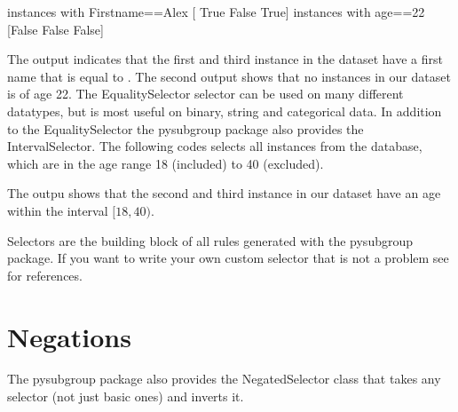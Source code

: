 \documentclass[letterpaper,10pt,english]{sphinxmanual}
\begin{document}
\begin{sphinxVerbatim}[commandchars=\\\{\}]
instances with  First\PYGZus{}name==\PYGZsq{}Alex\PYGZsq{} [ True False  True]
instances with age==22 [False False False]
\end{sphinxVerbatim}

The output indicates that the first and third instance in the dataset have a first name that is equal to .
The second output shows that no instances in our dataset is of age 22.
The EqualitySelector selector can be used on many different datatypes, but is most useful on binary, string and categorical data.
In addition to the EqualitySelector the pysubgroup package also provides the IntervalSelector. The following codes selects all instances from the database, which are in the age range 18 (included) to 40 (excluded).

\begin{sphinxVerbatim}[commandchars=\\\{\}]
    
\end{sphinxVerbatim}

\begin{sphinxVerbatim}
\end{sphinxVerbatim}

The outpu shows that the second and third instance in our dataset have an age within the interval \([18,40)\).

Selectors are the building block of all rules generated with the pysubgroup package. If you want to write your own custom selector that is not a problem see  for references.


\section{Negations}
\label{\detokenize{Selectors:negations}}
The pysubgroup package also provides the NegatedSelector class that takes any selector (not just basic ones) and inverts it.
\end{document}
